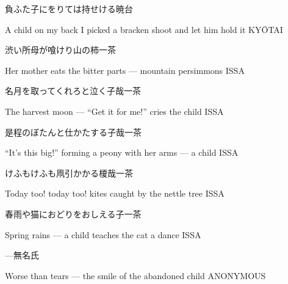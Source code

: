 \begin{haiku}
    {\FH 負ふた子にをりては持せける}\hfill{\FH 暁台}

    \vin{} A child on my back
    \vin{} \vin{} I picked a bracken shoot
    \vin{} \vin{} \vin{} and let him hold it \hspace{\fill} KY\={O}TAI
\end{haiku}

\begin{haiku}
    {\FH 渋い所母が喰けり山の柿}\hfill{\FH 一茶}

    \vin{} Her mother eats
    \vin{} \vin{} the bitter parts ---
    \vin{} \vin{} \vin{} mountain persimmons \hspace{\fill} ISSA
\end{haiku}

\begin{haiku}
    {\FH 名月を取ってくれろと泣く子哉}\hfill{\FH 一茶}

    \vin{} The harvest moon ---
    \vin{} \vin{} ``Get it for me!''
    \vin{} \vin{} \vin{} cries the child \hspace{\fill} ISSA
\end{haiku}

\begin{haiku}
    {\FH 是程のぼたんと仕かたする子哉}\hfill{\FH 一茶}

    \vin{} ``It's this big!''
    \vin{} \vin{} forming a peony with her arms ---
    \vin{} \vin{} \vin{} a child \hspace{\fill} ISSA
\end{haiku}

\begin{haiku}
    {\FH けふもけふも凧引かかる榎哉}\hfill{\FH 一茶}

    \vin{} Today too!
    \vin{} \vin{} today too! kites caught
    \vin{} \vin{} \vin{} by the nettle tree \hspace{\fill} ISSA
\end{haiku}

\begin{haiku}
    {\FH 春雨や猫におどりをおしえる子}\hfill{\FH 一茶}

    \vin{} Spring rains ---
    \vin{} \vin{} a child teaches the cat
    \vin{} \vin{} \vin{} a dance \hspace{\fill} ISSA
\end{haiku}

\begin{haiku}
    {---}\hfill{\FH 無名氏}

    \vin{} Worse than tears ---
    \vin{} \vin{} the smile of the
    \vin{} \vin{} \vin{} abandoned child \hspace{\fill} ANONYMOUS
\end{haiku}

